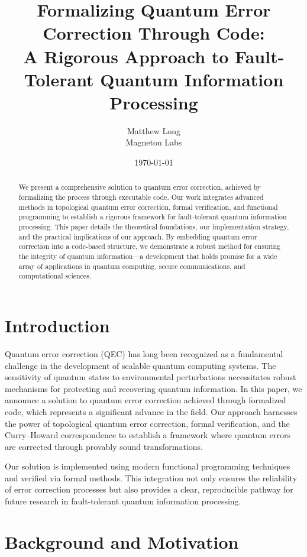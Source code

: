 \documentclass[12pt]{article}
\title{\bf Formalizing Quantum Error Correction Through Code:\\ A Rigorous Approach to Fault-Tolerant Quantum Information Processing}
\author{Matthew Long \\ Magneton Labs}
\date{\today}
\begin{document}
\maketitle

\begin{abstract}
We present a comprehensive solution to quantum error correction, achieved by formalizing the process through executable code. Our work integrates advanced methods in topological quantum error correction, formal verification, and functional programming to establish a rigorous framework for fault-tolerant quantum information processing. This paper details the theoretical foundations, our implementation strategy, and the practical implications of our approach. By embedding quantum error correction into a code-based structure, we demonstrate a robust method for ensuring the integrity of quantum information—a development that holds promise for a wide array of applications in quantum computing, secure communications, and computational sciences.
\end{abstract}

\tableofcontents

\newpage

\section{Introduction}
Quantum error correction (QEC) has long been recognized as a fundamental challenge in the development of scalable quantum computing systems. The sensitivity of quantum states to environmental perturbations necessitates robust mechanisms for protecting and recovering quantum information. In this paper, we announce a solution to quantum error correction achieved through formalized code, which represents a significant advance in the field. Our approach harnesses the power of topological quantum error correction, formal verification, and the Curry–Howard correspondence to establish a framework where quantum errors are corrected through provably sound transformations.

Our solution is implemented using modern functional programming techniques and verified via formal methods. This integration not only ensures the reliability of error correction processes but also provides a clear, reproducible pathway for future research in fault-tolerant quantum information processing.

\section{Background and Motivation}
\end{document}
